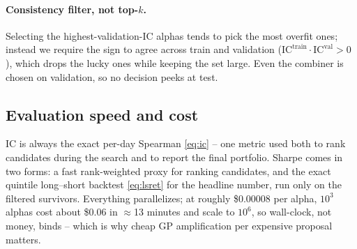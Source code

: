 \documentclass[11pt]{article}
\theoremstyle{definition}
\theoremstyle{plain}
\theoremstyle{remark}
\newcommand{\IC}{\mathrm{IC}}
\begin{document}
\paragraph{Consistency filter, not top-$k$.} Selecting the highest-validation-$\IC$ alphas tends
to pick the most overfit ones; instead we require the sign to agree across train and validation
($\IC^{\text{train}}\!\cdot\IC^{\text{val}}>0$), which drops the lucky ones while keeping the set
large. Even the combiner is chosen on validation, so no decision peeks at test.

\subsection{Evaluation speed and cost}

$\IC$ is always the exact per-day Spearman \eqref{eq:ic} -- one metric used both to rank
candidates during the search and to report the final portfolio. Sharpe comes in two forms: a
fast rank-weighted proxy for ranking candidates, and the exact quintile long--short backtest
\eqref{eq:lsret} for the headline number, run only on the filtered survivors. Everything
parallelizes; at roughly \$0.00008 per alpha, $10^3$ alphas cost about \$0.06 in $\approx$13
minutes and scale to $10^6$, so wall-clock, not money, binds -- which is why cheap GP
amplification per expensive proposal matters.
\end{document}
